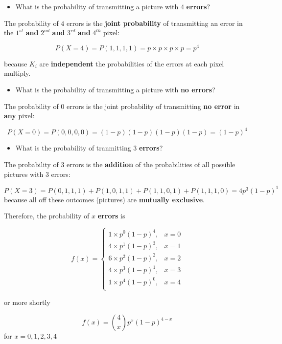\documentclass[
]{book}
\providecommand{\tightlist}{%
  \setlength{\itemsep}{0pt}\setlength{\parskip}{0pt}}
\begin{document}
\begin{itemize}
\tightlist
\item
  What is the probability of transmitting a picture with \(4\) \textbf{errors}?
\end{itemize}

The probability of \(4\) errors is the \textbf{joint probability} of transmitting an error in the \(1^{st}\) \textbf{and} \(2^{nd}\) \textbf{and} \(3^{rd}\) \textbf{and} \(4^{th}\) pixel:

\[P(X=4)=P(1,1,1,1)=p\times p\times p\times p=p^4\]

because \(K_i\) are \textbf{independent} the probabilities of the errors at each pixel multiply.

\begin{itemize}
\tightlist
\item
  What is the probability of transmitting a picture with \textbf{no errors}?
\end{itemize}

The probability of \(0\) errors is the joint probability of transmitting \textbf{no error} in \textbf{any} pixel:

\[P(X=0)=P(0,0,0,0)=(1-p)(1-p)(1-p)(1-p)=(1-p)^4\]

\begin{itemize}
\tightlist
\item
  What is the probability of tranmitting \(3\) \textbf{errors}?
\end{itemize}

The probability of \(3\) errors is the \textbf{addition} of the probabilities of all possible pictures with \(3\) errors:

\[P(X=3)=P(0,1,1,1)+P(1,0,1,1)+P(1,1,0,1)+P(1,1,1,0)=4p^3(1-p)^1\]
because all off these outcomes (pictures) are \textbf{mutually exclusive}.

Therefore, the probability of \(x\) \textbf{errors} is

\[
    f(x)= 
\begin{cases}
    1\times p^0(1-p)^4,&  x=0 \\
    4\times p^1(1-p)^3,&  x=1 \\
    6\times p^2(1-p)^2,&  x=2 \\
    4\times p^3(1-p)^1,&  x=3 \\
    1\times p^4(1-p)^0,&  x=4 \\
\end{cases}
\]

or more shortly

\[f(x)=\binom 4 x p^x(1-p)^{4-x}\]
for \(x=0,1,2,3,4\)
\end{document}
